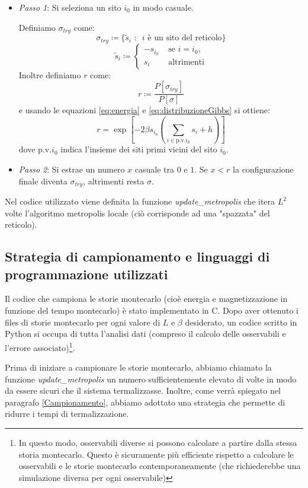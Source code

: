 \documentclass[10pt,a4paper]{article}
\begin{document}
\begin{itemize}
	\item \emph{Passo 1}: Si seleziona un sito $i_0$ in modo casuale. 
	
	Definiamo $\sigma_{try}$ come: $$\sigma_{try}\coloneqq\{ \tilde{s}_i\text{ :}\text{ } i  \text{ è un sito del reticolo} \}$$ 
	\begin{equation*}
	\tilde{s}_{i}\coloneqq
	\begin{cases}
	-s_{i_0} & \text{ se $i= i_0 $,	} \\
	s_i & \text{ altrimenti}
	\end{cases}
	\end{equation*}
	Inoltre definiamo $r$ come:
	$$r\coloneqq \frac{P[\sigma_{try}]}{P[\sigma]}$$
	e usando le equazioni \ref{eq:energia} e \ref{eq:distribuzioneGibbs} si ottiene:
	$$r=\exp\left[-2\beta s_{i_0}\left(\sum_{i\in\text{p.v.}i_0}s_i+h\right)\right]$$
	dove $\text{p.v.}i_0$ indica l'insieme dei siti primi vicini del sito $i_0$.
	\item \emph{Passo 2}: Si estrae un numero $x$ casuale tra $0$ e $1$. Se $x<r$ la configurazione finale diventa $\sigma_{try}$, altrimenti resta $\sigma$.
\end{itemize}
Nel codice utilizzato viene definita la funzione \emph{update\_metropolis} che itera $L^2$ volte l'algoritmo metropolis locale (ciò corrisponde ad una "spazzata" del reticolo). 
\subsection{Strategia di campionamento e linguaggi di programmazione utilizzati}
Il codice che campiona le storie montecarlo (cioè energia e magnetizzazione in funzione del tempo montecarlo) è stato implementato in C. Dopo aver ottenuto i files di storie montecarlo per ogni valore di $L$ e $\beta$ desiderato, un codice scritto in Python si occupa di tutta l'analisi dati (compreso il calcolo delle osservabili e l'errore associato)\footnote{In questo modo, osservabili diverse si possono calcolare a partire dalla stessa storia montecarlo. Questo è sicuramente più efficiente rispetto a calcolare le osservabili e le storie montecarlo contemporaneamente (che richiederebbe una simulazione diversa per ogni osservabile)}.


Prima di iniziare a campionare le storie montecarlo, abbiamo chiamato la funzione \emph{update\_metropolis} un numero sufficientemente elevato di volte in modo da essere sicuri che il sistema termalizzasse. Inoltre, come verrà spiegato nel paragrafo \ref{Campionamento}, abbiamo adottato una strategia che permette di ridurre i tempi di termalizzazione.
\end{document}
